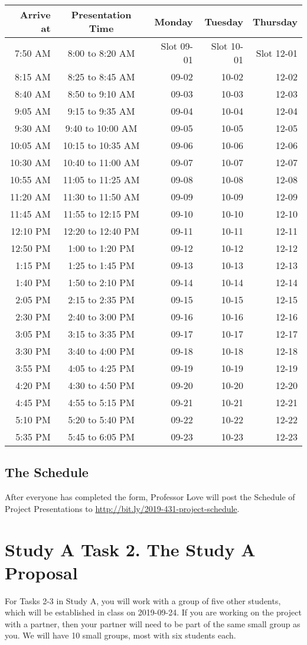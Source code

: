 \documentclass[]{book}
\begin{document}
\begin{longtable}[]{@{}rcrrr@{}}
\toprule
Arrive at & Presentation Time & Monday & Tuesday & Thursday\tabularnewline
\midrule
\endhead
7:50 AM & 8:00 to 8:20 AM & Slot 09-01 & Slot 10-01 & Slot 12-01\tabularnewline
8:15 AM & 8:25 to 8:45 AM & 09-02 & 10-02 & 12-02\tabularnewline
8:40 AM & 8:50 to 9:10 AM & 09-03 & 10-03 & 12-03\tabularnewline
9:05 AM & 9:15 to 9:35 AM & 09-04 & 10-04 & 12-04\tabularnewline
9:30 AM & 9:40 to 10:00 AM & 09-05 & 10-05 & 12-05\tabularnewline
10:05 AM & 10:15 to 10:35 AM & 09-06 & 10-06 & 12-06\tabularnewline
10:30 AM & 10:40 to 11:00 AM & 09-07 & 10-07 & 12-07\tabularnewline
10:55 AM & 11:05 to 11:25 AM & 09-08 & 10-08 & 12-08\tabularnewline
11:20 AM & 11:30 to 11:50 AM & 09-09 & 10-09 & 12-09\tabularnewline
11:45 AM & 11:55 to 12:15 PM & 09-10 & 10-10 & 12-10\tabularnewline
12:10 PM & 12:20 to 12:40 PM & 09-11 & 10-11 & 12-11\tabularnewline
12:50 PM & 1:00 to 1:20 PM & 09-12 & 10-12 & 12-12\tabularnewline
1:15 PM & 1:25 to 1:45 PM & 09-13 & 10-13 & 12-13\tabularnewline
1:40 PM & 1:50 to 2:10 PM & 09-14 & 10-14 & 12-14\tabularnewline
2:05 PM & 2:15 to 2:35 PM & 09-15 & 10-15 & 12-15\tabularnewline
2:30 PM & 2:40 to 3:00 PM & 09-16 & 10-16 & 12-16\tabularnewline
3:05 PM & 3:15 to 3:35 PM & 09-17 & 10-17 & 12-17\tabularnewline
3:30 PM & 3:40 to 4:00 PM & 09-18 & 10-18 & 12-18\tabularnewline
3:55 PM & 4:05 to 4:25 PM & 09-19 & 10-19 & 12-19\tabularnewline
4:20 PM & 4:30 to 4:50 PM & 09-20 & 10-20 & 12-20\tabularnewline
4:45 PM & 4:55 to 5:15 PM & 09-21 & 10-21 & 12-21\tabularnewline
5:10 PM & 5:20 to 5:40 PM & 09-22 & 10-22 & 12-22\tabularnewline
5:35 PM & 5:45 to 6:05 PM & 09-23 & 10-23 & 12-23\tabularnewline
\bottomrule
\end{longtable}

\hypertarget{the-schedule}{%
\section{The Schedule}\label{the-schedule}}

After everyone has completed the form, Professor Love will post the Schedule of Project Presentations to \url{http://bit.ly/2019-431-project-schedule}.

\hypertarget{task2a}{%
\chapter{Study A Task 2. The Study A Proposal}\label{task2a}}

For Tasks 2-3 in Study A, you will work with a group of five other students, which will be established in class on 2019-09-24. If you are working on the project with a partner, then your partner will need to be part of the same small group as you. We will have 10 small groups, most with six students each.
\end{document}
